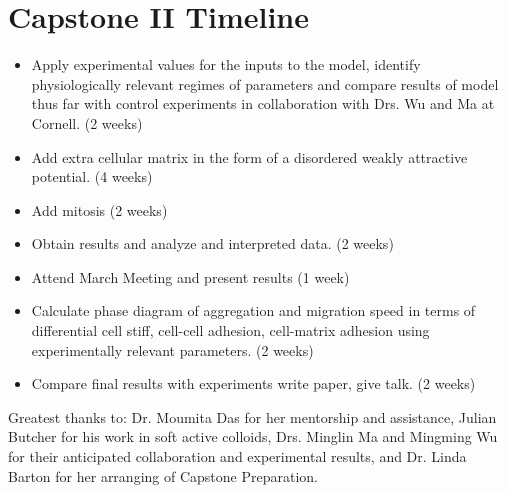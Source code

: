 \documentclass[aps,prb,twocolumn,groupedaddress,nofootinbib,floatfix]{revtex4}
\begin{document}
\section*{Capstone II Timeline}
\begin{itemize}\itemsep1pt \parskip0pt
\item Apply experimental values for the inputs to the model, identify physiologically relevant regimes of parameters
and compare results of model thus far with control experiments in collaboration with Drs. Wu and Ma at Cornell. (2 weeks) 
\item Add extra cellular matrix in the form of a disordered weakly attractive potential. (4 weeks) 
\item Add mitosis (2 weeks)
\item Obtain results and analyze and interpreted  data. (2 weeks)
\item Attend March Meeting and present results (1 week)
\item Calculate phase diagram of aggregation and migration speed in terms of differential 
cell stiff, cell-cell adhesion, cell-matrix adhesion using experimentally relevant parameters. (2 weeks)
 \item Compare final results with experiments  write paper, give talk. (2 weeks)
\end{itemize}

\begin{acknowledgments}
Greatest thanks to: Dr. Moumita Das for her mentorship and assistance, Julian Butcher for his work in soft active colloids, Drs. Minglin Ma and Mingming Wu for their anticipated collaboration and experimental results, and Dr. Linda Barton for her arranging of Capstone Preparation.
\end{acknowledgments}

\vspace{0.6in}
%
%



\end{document}
